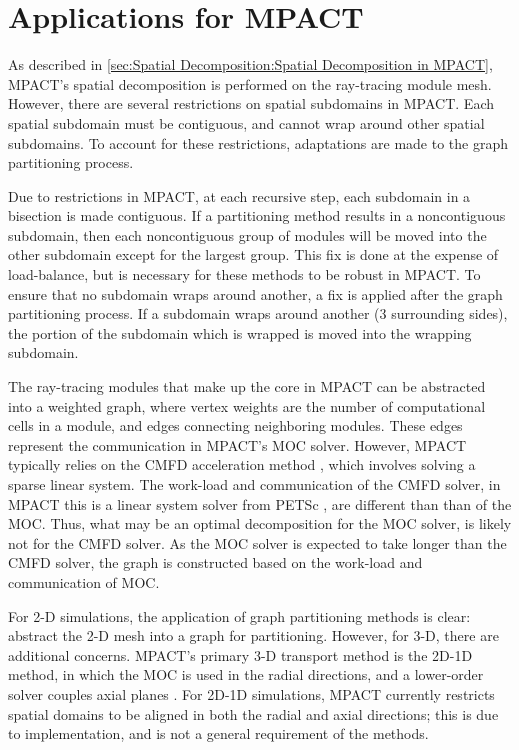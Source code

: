 {  \section{Applications for MPACT}{\label{sec:Spatial Decomposition:Applications for MPACT}
    As described in \cref{sec:Spatial Decomposition:Spatial Decomposition in MPACT}, MPACT's spatial decomposition is performed on the ray-tracing module mesh.
    However, there are several restrictions on spatial subdomains in MPACT.
    Each spatial subdomain must be contiguous, and cannot wrap around other spatial subdomains.
    To account for these restrictions, adaptations are made to the graph partitioning process.

    Due to restrictions in MPACT, at each recursive step, each subdomain in a bisection is made contiguous.
    If a partitioning method results in a noncontiguous subdomain, then each noncontiguous group of modules will be moved into the other subdomain except for the largest group.
    This fix is done at the expense of load-balance, but is necessary for these methods to be robust in MPACT.
    To ensure that no subdomain wraps around another, a fix is applied after the graph partitioning process.
    If a subdomain wraps around another (3 surrounding sides), the portion of the subdomain which is wrapped is moved into the wrapping subdomain.

    The ray-tracing modules that make up the core in MPACT can be abstracted into a weighted graph, where vertex weights are the number of computational cells in a module, and edges connecting neighboring modules.
    These edges represent the communication in MPACT's \ac{MOC} solver.
    However, MPACT typically relies on the \ac{CMFD} acceleration method \cite{Smith1983}, which involves solving a sparse linear system.
    The work-load and communication of the \ac{CMFD} solver, in MPACT this is a linear system solver from PETSc \cite{Petsc}, are different than than of the \ac{MOC}.
    Thus, what may be an optimal decomposition for the \ac{MOC} solver, is likely not for the \ac{CMFD} solver.
    As the \ac{MOC} solver is expected to take longer than the \ac{CMFD} solver, the graph is constructed based on the work-load and communication of \ac{MOC}.

    For 2-D simulations, the application of graph partitioning methods is clear: abstract the 2-D mesh into a graph for partitioning.
    However, for 3-D, there are additional concerns.
    MPACT's primary 3-D transport method is the 2D-1D method, in which the \ac{MOC} is used in the radial directions, and a lower-order solver couples axial planes \cite{Collins2016}.
    For 2D-1D simulations, MPACT currently restricts spatial domains to be aligned in both the radial and axial directions; this is due to implementation, and is not a general requirement of the methods.

}}

